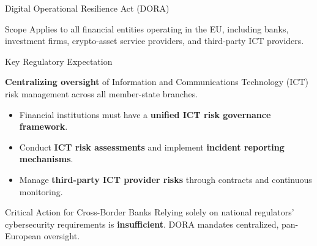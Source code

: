 \documentclass{beamer}
\begin{document}
	\begin{frame}{Digital Operational Resilience Act (DORA)}
		\begin{block}{Scope}
			Applies to all financial entities operating in the EU, including banks, investment firms, crypto-asset service providers, and third-party ICT providers.
		\end{block}
		\begin{block}{Key Regulatory Expectation}
			\begin{center}
				\textbf{Centralizing oversight} of Information and Communications Technology (ICT) risk management across all member-state branches.
			\end{center}
			\begin{itemize}
				\item Financial institutions must have a \textbf{unified ICT risk governance framework}.
				\item Conduct \textbf{ICT risk assessments} and implement \textbf{incident reporting mechanisms}.
				\item Manage \textbf{third-party ICT provider risks} through contracts and continuous monitoring.
			\end{itemize}
		\end{block}
		\begin{alertblock}{Critical Action for Cross-Border Banks}
			Relying solely on national regulators' cybersecurity requirements is \textbf{insufficient}. DORA mandates centralized, pan-European oversight.
		\end{alertblock}
	\end{frame}
	
\end{document}
